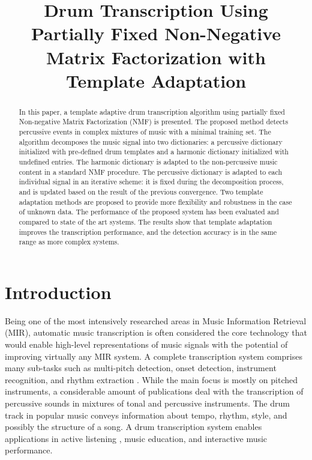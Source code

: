 \documentclass{article}
\title{Drum Transcription Using Partially Fixed Non-Negative Matrix Factorization with Template Adaptation}
\begin{document}
%
\maketitle
%
\begin{abstract}
In this paper, a template adaptive drum transcription algorithm using partially fixed Non-negative Matrix Factorization (NMF) is presented. The proposed method detects percussive events in complex mixtures of music with a minimal training set. The algorithm decomposes the music signal into two dictionaries: a percussive dictionary initialized with pre-defined drum templates and a harmonic dictionary initialized with undefined entries. The harmonic dictionary is adapted to the non-percussive music content in a standard NMF procedure. The percussive dictionary is adapted to each individual signal in an iterative scheme: it is fixed during the decomposition process, and is updated based on the result of the previous convergence. Two template adaptation methods are proposed to provide more flexibility and robustness in the case of unknown data. The performance of the proposed system has been evaluated and compared to state of the art systems. The results show that template adaptation improves the transcription performance, and the detection accuracy is in the same range as more complex systems.  

\end{abstract}
%

\section{Introduction}\label{sec:introduction}
Being one of the most intensively researched areas in Music Information Retrieval (MIR), automatic music transcription is often considered the core technology that would enable high-level representations of music signals with the potential of improving virtually any MIR system. A complete transcription system comprises many sub-tasks such as multi-pitch detection, onset detection, instrument recognition, and rhythm extraction \cite{benetos_automatic_2013}. While the main focus is mostly on pitched instruments, a considerable amount of publications deal with the transcription of percussive sounds in mixtures of tonal and percussive instruments. The drum track in popular music conveys information about tempo, rhythm, style, and possibly the structure of a song. A drum transcription system enables applications in active listening \cite{yoshii_drumix:_2007}, music education, and interactive music performance.
\end{document}
